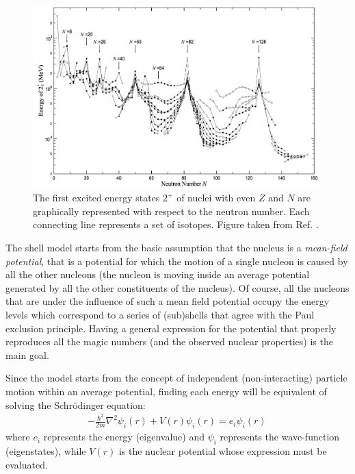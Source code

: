 \begin{figure}
    \centering
    \includegraphics[width=0.99\textwidth]{Chapters/Figures/E2plus_neutron.pdf}
    \caption{The first excited energy states $2^+$ of nuclei with even $Z$ and $N$ are graphically represented with respect to the neutron number. Each connecting line represents a set of isotopes. Figure taken from Ref. \cite{matta2017exotic}.}
    \label{e2plus_neutron}
\end{figure}

The shell model starts from the basic assumption that the nucleus is a \emph{mean-field potential}, that is a potential for which the motion of a single nucleon is caused by all the other nucleons (the nucleon is moving inside an average potential generated by all the other constituents of the nucleus). Of course, all the nucleons that are under the influence of such a mean field potential occupy the energy levels which correspond to a series of (sub)shells that agree with the Paul exclusion principle. Having a general expression for the potential that properly reproduces all the magic numbers (and the observed nuclear properties) is the main goal.

Since the model starts from the concept of independent (non-interacting) particle motion within an average potential, finding each energy will be equivalent of solving the Schrödinger equation:
\begin{align}
    -\frac{\hbar^2}{2m}\nabla ^2\psi_i(r)+V(r)\psi_i(r)=e_i\psi_i(r)\, 
    \label{schrodinger-single-particle-eq}
\end{align}
where $e_i$ represents the energy (eigenvalue) and $\psi_i$ represents the wave-function (eigenstates), while $V(r)$ is the nuclear potential whose expression must be evaluated.

